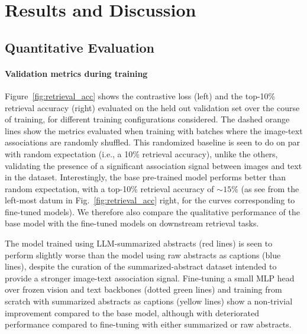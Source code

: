 \documentclass{article} %
\begin{document}
   \section{Results and Discussion}
   \label{sec:results}
   
   \subsection{Quantitative Evaluation}
   
   \paragraph*{Validation metrics during training}
   
   Figure~\ref{fig:retrieval_acc} shows the contrastive loss (left) and the top-10\% retrieval accuracy (right) evaluated on the held out validation set over the course of training, for different training configurations considered.
   The dashed orange lines show the metrics evaluated when training with batches where the image-text associations are randomly shuffled.
   This randomized baseline is seen to do on par with random expectation (i.e., a 10\% retrieval accuracy), unlike the others, validating the presence of a significant association signal between images and text in the dataset.
   Interestingly, the base pre-trained model performs better than random expectation, with a top-10\% retrieval accuracy of $\sim 15\%$ (as see from the left-most datum in Fig.~\ref{fig:retrieval_acc} right, for the curves corresponding to fine-tuned models).
   We therefore also compare the qualitative performance of the base model with the fine-tuned models on downstream retrieval tasks.
   
   The model trained using LLM-summarized abstracts (red lines) is seen to perform slightly worse than the model using raw abstracts as captions (blue lines), despite the curation of the summarized-abstract dataset intended to provide a stronger image-text association signal.
   Fine-tuning a small MLP head over frozen vision and text backbones (dotted green lines) and training from scratch with summarized abstracts as captions (yellow lines) show a non-trivial improvement compared to the base model, although with deteriorated performance compared to fine-tuning with either summarized or raw abstracts.
   
\end{document}
